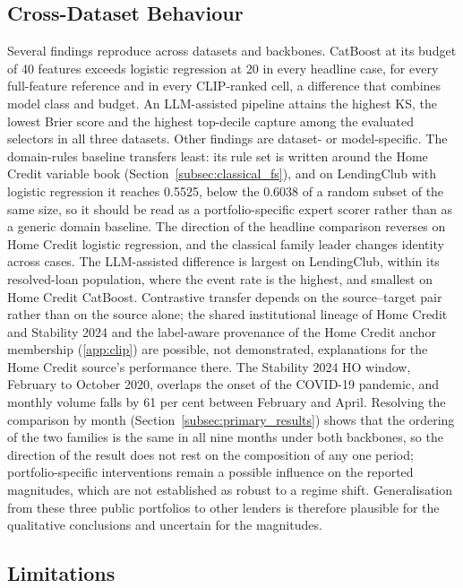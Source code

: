 \documentclass[final,5p,twocolumn]{elsarticle}
\begin{document}
\subsection{Cross-Dataset Behaviour}
\label{subsec:cross_dataset}

Several findings reproduce across datasets and backbones. CatBoost at its budget of 40 features exceeds logistic regression at 20 in every headline case, for every full-feature reference and in every CLIP-ranked cell, a difference that combines model class and budget. An LLM-assisted pipeline attains the highest KS, the lowest Brier score and the highest top-decile capture among the evaluated selectors in all three datasets. Other findings are dataset- or model-specific. The domain-rules baseline transfers least: its rule set is written around the Home Credit variable book (Section~\ref{subsec:classical_fs}), and on LendingClub with logistic regression it reaches 0.5525, below the 0.6038 of a random subset of the same size, so it should be read as a portfolio-specific expert scorer rather than as a generic domain baseline. The direction of the headline comparison reverses on Home Credit logistic regression, and the classical family leader changes identity across cases. The LLM-assisted difference is largest on LendingClub, within its resolved-loan population, where the event rate is the highest, and smallest on Home Credit CatBoost. Contrastive transfer depends on the source--target pair rather than on the source alone; the shared institutional lineage of Home Credit and Stability 2024 and the label-aware provenance of the Home Credit anchor membership (\ref{app:clip}) are possible, not demonstrated, explanations for the Home Credit source's performance there. The Stability 2024 HO window, February to October 2020, overlaps the onset of the COVID-19 pandemic, and monthly volume falls by 61 per cent between February and April. Resolving the comparison by month (Section~\ref{subsec:primary_results}) shows that the ordering of the two families is the same in all nine months under both backbones, so the direction of the result does not rest on the composition of any one period; portfolio-specific interventions remain a possible influence on the reported magnitudes, which are not established as robust to a regime shift. Generalisation from these three public portfolios to other lenders is therefore plausible for the qualitative conclusions and uncertain for the magnitudes.

\subsection{Limitations}
\label{subsec:limitations}
\end{document}
